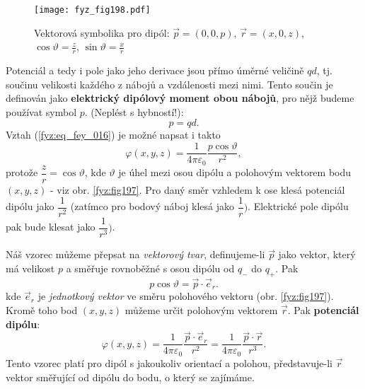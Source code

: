   \begin{figure}[ht!] %
    \centering
    \texttt{[image: fyz\_fig198.pdf]}
    \caption{Vektorová symbolika pro dipól: \(\vec{p} = (0, 0, p)\), \(\vec{r} = (x, 0, z)\), 
             \(\cos\vartheta = \frac{z}{r}\), \(\sin\vartheta = \frac{x}{r}\)}
    \label{fyz:fig198}
  \end{figure}
  Potenciál a tedy i pole jako jeho derivace jsou přímo úměrné veličině \(qd\), tj. součinu 
  velikosti každého z nábojů a vzdálenosti mezi nimi. Tento součin je definován jako 
  \textbf{elektrický dipólový moment obou nábojů}, pro nějž budeme používat symbol \(p\). 
  (Neplést s hybností!):
  \begin{equation}\label{fyz:eq_fey_017}
    p = qd.
  \end{equation}
  Vztah (\ref{fyz:eq_fey_016}) je možné napsat i takto
  \begin{equation}\label{fyz:eq_fey_018}
    \varphi(x,y,z) = \dfrac{1}{4\pi\varepsilon_0}\dfrac{p\cos\vartheta}{r^2},
  \end{equation}
  protože \(\dfrac{z}{r} = \cos\vartheta\), kde \(\vartheta\) je úhel mezi osou dipólu a 
  polohovým vektorem bodu \((x, y, z)\) - viz obr. \ref{fyz:fig197}. Pro daný směr vzhledem k 
  ose klesá potenciál dipólu jako \(\dfrac{1}{r^2}\) (zatímco pro bodový náboj klesá jako 
  \(\dfrac{1}{r})\). Elektrické pole dipólu pak bude klesat jako \(\dfrac{1}{r^3})\).

  Náš vzorec můžeme přepsat na \emph{vektorový tvar}, definujeme-li \(\vec{p}\) jako vektor, 
  který má velikost \(p\) a směřuje rovnoběžné s osou dipólu od \(q_-\) do \(q_+\). Pak
   \begin{equation}\label{fyz:eq_fey_019}
    p\cos\vartheta = \vec{p}\cdot\vec{e}_r.
  \end{equation}
  kde \(\vec{e}_r\) je \emph{jednotkový vektor} ve směru polohového vektoru (obr. 
  \ref{fyz:fig197}). Kromě toho bod \((x, y, z)\) můžeme určit polohovým vektorem \(\vec{r}\). 
  Pak \textbf{potenciál dipólu}:
  \begin{equation}\label{fyz:eq_fey_020}
    \varphi(x,y,z) = \dfrac{1}{4\pi\varepsilon_0}\dfrac{\vec{p}\cdot\vec{e}_r}{r^2}
                   = \dfrac{1}{4\pi\varepsilon_0}\dfrac{\vec{p}\cdot\vec{r}}{r^3}.
  \end{equation}
  Tento vzorec platí pro dipól s jakoukoliv orientací a polohou, představuje-li \(\vec{r}\) 
  vektor směřující od dipólu do bodu, o který se zajímáme.

